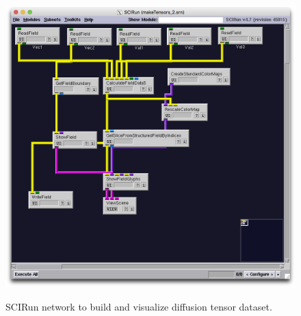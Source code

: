 \begin{figure}[p]
\begin{center}
\includegraphics[width=\textwidth]{Figures/make_DTI.png}\\
\caption{SCIRun network to build and visualize diffusion tensor dataset.}
\label{fig:maketensornet}
\end{center}
\end{figure}

